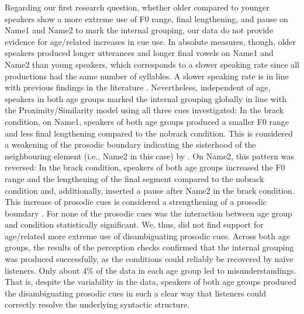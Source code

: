 \documentclass[output=paper]{langscibook}
\begin{document}
\begin{sloppypar}
Regarding our first research question, whether older compared to younger speakers show a more extreme use of F0 range, final lengthening, and pause on Name1 and Name2 to mark the internal grouping, our data do not provide evidence for age\-/related increases in cue use. In absolute measures, though, older speakers produced longer utterances and longer final vowels on Name1 and Name2 than young speakers, which corresponds to a slower speaking rate since all productions had the same number of syllables. A slower speaking rate is in line with previous findings in the literature \citep{kemper_etal_1995_y+o_speaker+listener, scukanec_etal1996,harnsberger_etal2008,barnes_2013,smiljanic2017,dimitrova_etal_2018,tuomainen_hazan2018, hazan2019, tuomainen2019, tuomainen2021age}. Nevertheless, independent of age, speakers in both age groups marked the internal grouping globally in line with the Proximity\fshyp Similarity model \citep{kentner_new_2013} using all three cues investigated: In the brack condition, on Name1, speakers of both age groups produced a smaller F0 range and less final lengthening compared to the nobrack condition. This is considered a weakening of the prosodic boundary indicating the sisterhood of the neighbouring element (i.e., Name2 in this case) by \citet{kentner_new_2013}. On Name2, this pattern was reversed: In the brack condition, speakers of both age groups increased the F0 range and the lengthening of the final segment compared to the nobrack condition and, additionally, inserted a pause after Name2 in the brack condition. This increase of prosodic cues is considered a strengthening of a prosodic boundary \citep{kentner_new_2013}. For none of the prosodic cues was the interaction between age group and condition statistically significant. We, thus, did not find support for age\-/related more extreme use of disambiguating prosodic cues. Across both age groups, the results of the perception checks confirmed that the internal grouping was produced successfully, as the conditions could reliably be recovered by na\"ive listeners. Only about 4\% of the data in each age group led to misunderstandings. That is, despite the variability in the data, speakers of both age groups produced the disambiguating prosodic cues in such a clear way that listeners could correctly resolve the underlying syntactic structure. 
\end{sloppypar}
\end{document}
